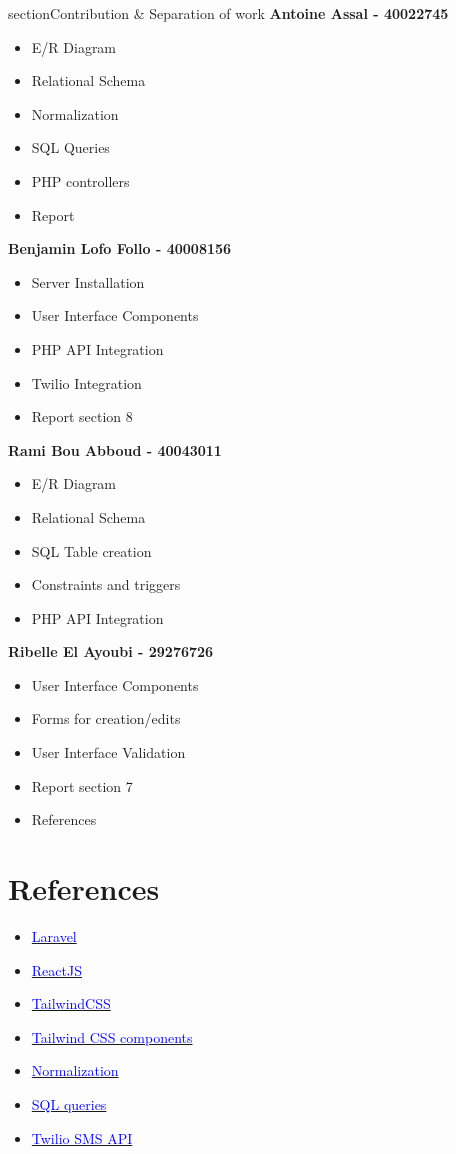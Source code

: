 section{Contribution \& Separation of work}
\textbf{Antoine Assal - 40022745}
\begin{itemize}
    \item E/R Diagram
    \item Relational Schema 
    \item Normalization
    \item SQL Queries
    \item PHP controllers
    \item Report
\end{itemize}
\textbf{Benjamin Lofo Follo  - 40008156}
\begin{itemize}
    \item Server Installation
    \item User Interface Components
    \item PHP API Integration
    \item Twilio Integration 
    \item Report section 8
\end{itemize}
\textbf{Rami Bou Abboud  - 40043011}
\begin{itemize}
    \item E/R Diagram
    \item Relational Schema
    \item SQL Table creation
    \item Constraints and triggers
    \item PHP API Integration
\end{itemize}
\textbf{Ribelle El Ayoubi  - 29276726}
\begin{itemize}
    \item User Interface Components
    \item Forms for creation/edits
    \item User Interface Validation
    \item Report section 7 
    \item References
\end{itemize}

\section{References}
\begin{itemize}
    \item \href{https://laravel.com/docs/8.x}{\textcolor{blue}{Laravel}}
    \item \href{https://reactjs.org/docs/getting-started.html}{\textcolor{blue}{ReactJS}}
    \item \href{https://tailwindcss.com/docs}{\textcolor{blue}{TailwindCSS}}
    \item \href{https://tailwindui.com/}{\textcolor{blue}{Tailwind CSS components}}
    \item \href{https://opentextbc.ca/dbdesign01/chapter/chapter-12-normalization/}{\textcolor{blue}{Normalization}}
    \item \href{https://www.w3schools.com/sql/}{\textcolor{blue}{SQL queries}}
    \item \href{https://www.twilio.com/docs/sms}{\textcolor{blue}{Twilio SMS API}}
\end{itemize}

